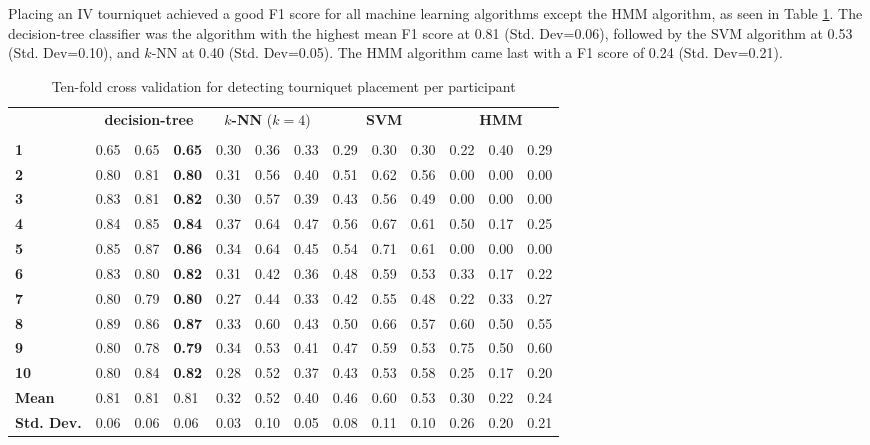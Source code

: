 \par Placing an IV tourniquet achieved a good F1 score for all machine learning algorithms except the HMM algorithm, as seen in Table \ref{tab:t:ml}. The decision-tree classifier was the algorithm with the highest mean F1 score at 0.81 (Std. Dev=0.06), followed by the SVM algorithm at 0.53 (Std. Dev=0.10), and $k$-NN at 0.40 (Std. Dev=0.05). The HMM algorithm came last with a F1 score of 0.24 (Std. Dev=0.21).
\begin{table}[h]
	\centering
	\begin{tabular}{lllllllllllll}
		\multirow{2}{*}{\rotatebox[origin=c]{45}{\textbf{Participant}}} & \multicolumn{3}{c}{\textbf{decision-tree}} & \multicolumn{3}{c}{\textbf{$k$-NN} ($k=4$)} & \multicolumn{3}{c}{\textbf{SVM}} & \multicolumn{3}{c}{\textbf{HMM}} \\
		& \rot{Precision}     & \rot{Recall}    & \rot{F1}    & \rot{Precision}     & \rot{Recall}    & \rot{F1}  & \rot{Precision}     & \rot{Recall}    & \rot{F1} & \rot{Precision}     & \rot{Recall}    & \rot{F1} \\
		\textbf{1}   & 0.65 & 0.65 & \textbf{0.65} & 0.30 & 0.36 & 0.33 & 0.29 & 0.30 & 0.30 & 0.22 & 0.40 & 0.29 \\
		\textbf{2}   & 0.80 & 0.81 & \textbf{0.80} & 0.31 & 0.56 & 0.40 & 0.51 & 0.62 & 0.56 & 0.00 & 0.00 & 0.00 \\
		\textbf{3}   & 0.83 & 0.81 & \textbf{0.82} & 0.30 & 0.57 & 0.39 & 0.43 & 0.56 & 0.49 & 0.00 & 0.00 & 0.00 \\
		\textbf{4}   & 0.84 & 0.85 & \textbf{0.84} & 0.37 & 0.64 & 0.47 & 0.56 & 0.67 & 0.61 & 0.50 & 0.17 & 0.25 \\
		\textbf{5}   & 0.85 & 0.87 & \textbf{0.86} & 0.34 & 0.64 & 0.45 & 0.54 & 0.71 & 0.61 & 0.00 & 0.00 & 0.00 \\
		\textbf{6}   & 0.83 & 0.80 & \textbf{0.82} & 0.31 & 0.42 & 0.36 & 0.48 & 0.59 & 0.53 & 0.33 & 0.17 & 0.22 \\
		\textbf{7}   & 0.80 & 0.79 & \textbf{0.80} & 0.27 & 0.44 & 0.33 & 0.42 & 0.55 & 0.48 & 0.22 & 0.33 & 0.27 \\
		\textbf{8}   & 0.89 & 0.86 & \textbf{0.87} & 0.33 & 0.60 & 0.43 & 0.50 & 0.66 & 0.57 & 0.60 & 0.50 & 0.55 \\
		\textbf{9}   & 0.80 & 0.78 & \textbf{0.79} & 0.34 & 0.53 & 0.41 & 0.47 & 0.59 & 0.53 & 0.75 & 0.50 & 0.60 \\
		\textbf{10} & 0.80 & 0.84 & \textbf{0.82} & 0.28 & 0.52 & 0.37 & 0.43 & 0.53 & 0.58 & 0.25 & 0.17 & 0.20 \\
		\hline
		\textbf{Mean} & 0.81 & 0.81 & 0.81 & 0.32 & 0.52 & 0.40 & 0.46 & 0.60 & 0.53 & 0.30 & 0.22 & 0.24 \\
		\textbf{Std. Dev.} & 0.06 & 0.06 & 0.06 & 0.03 & 0.10 & 0.05 & 0.08 & 0.11 & 0.10 & 0.26 & 0.20 & 0.21
	\end{tabular}
	\caption{Ten-fold cross validation for detecting tourniquet placement per participant}
	\label{tab:t:ml}
\end{table}

